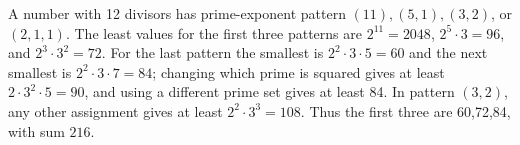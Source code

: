 A number with 12 divisors has prime-exponent pattern $(11),(5,1),(3,2)$, or $(2,1,1)$. The least values for the first three patterns are $2^{11}=2048$, $2^5\cdot3=96$, and $2^3\cdot3^2=72$. For the last pattern the smallest is $2^2\cdot3\cdot5=60$ and the next smallest is $2^2\cdot3\cdot7=84$; changing which prime is squared gives at least $2\cdot3^2\cdot5=90$, and using a different prime set gives at least 84. In pattern $(3,2)$, any other assignment gives at least $2^2\cdot3^3=108$. Thus the first three are 60,72,84, with sum $\boxed{216}$.
